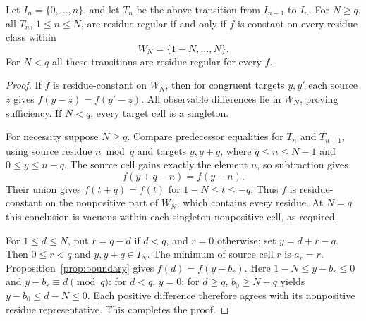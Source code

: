 \begin{theorem}\label{thm:rigidity}
Let $I_n=\{0,\ldots,n\}$, and let $T_n$ be the above transition from $I_{n-1}$ to $I_n$. For $N\ge q$, all $T_n$, $1\le n\le N$, are residue-regular if and only if $f$ is constant on every residue class within
\[
W_N=\{1-N,\ldots,N\}.
\]
For $N<q$ all these transitions are residue-regular for every $f$.
\end{theorem}
\begin{proof}
If $f$ is residue-constant on $W_N$, then for congruent targets $y,y'$ each source $z$ gives $f(y-z)=f(y'-z)$. All observable differences lie in $W_N$, proving sufficiency. If $N<q$, every target cell is a singleton.

For necessity suppose $N\ge q$. Compare predecessor equalities for $T_n$ and $T_{n+1}$, using source residue $n\bmod q$ and targets $y,y+q$, where $q\le n\le N-1$ and $0\le y\le n-q$. The source cell gains exactly the element $n$, so subtraction gives
\[
f(y+q-n)=f(y-n).
\]
Their union gives $f(t+q)=f(t)$ for $1-N\le t\le-q$. Thus $f$ is residue-constant on the nonpositive part of $W_N$, which contains every residue. At $N=q$ this conclusion is vacuous within each singleton nonpositive cell, as required.

For $1\le d\le N$, put $r=q-d$ if $d<q$, and $r=0$ otherwise; set $y=d+r-q$. Then $0\le r<q$ and $y,y+q\in I_N$. The minimum of source cell $r$ is $a_r=r$. Proposition~\ref{prop:boundary} gives $f(d)=f(y-b_r)$. Here $1-N\le y-b_r\le0$ and $y-b_r\equiv d\pmod q$: for $d<q$, $y=0$; for $d\ge q$, $b_0\ge N-q$ yields $y-b_0\le d-N\le0$. Each positive difference therefore agrees with its nonpositive residue representative. This completes the proof.
\end{proof}

